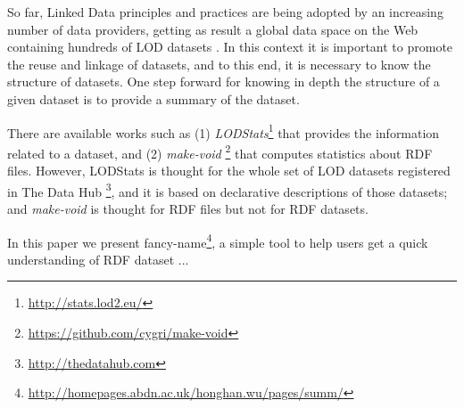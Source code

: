 So far, Linked Data principles and practices are being adopted by an increasing number of data providers, getting as result a global data space on the Web containing hundreds of LOD datasets \cite{Heath_Bizer_2011}. In this context it is important to promote the reuse and linkage of datasets, and to this end, it is necessary to know the structure of datasets. One step forward for knowing in depth the structure of a given dataset is to provide a summary of the dataset.

There are available works such as (1) \emph{LODStats}\footnote{\footnotesize \url{http://stats.lod2.eu/}} that provides the information related to a dataset, and (2) \emph{make-void} \footnote{\footnotesize \url{https://github.com/cygri/make-void}} that computes statistics about RDF files. However, LODStats is thought for the whole set of LOD datasets registered in The Data Hub \footnote{\footnotesize \url{http://thedatahub.com}}, and it is based on declarative descriptions of those datasets; and \emph{make-void} is thought for RDF files but not for RDF datasets.

In this paper we present fancy-name\footnote{\footnotesize \url{http://homepages.abdn.ac.uk/honghan.wu/pages/summ/}}, a simple tool to help users get a quick understanding of RDF dataset ...

